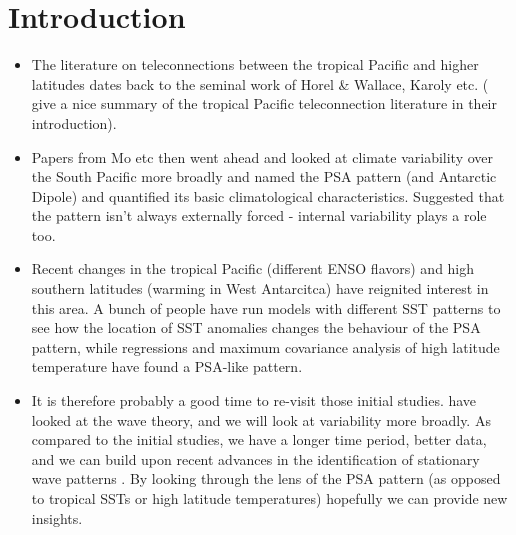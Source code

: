 \section{Introduction}

\begin{itemize}
\item The literature on teleconnections between the tropical Pacific and higher latitudes dates back to the seminal work of Horel & Wallace, Karoly etc. (\citet{Ciasto2015} give a nice summary of the tropical Pacific teleconnection literature in their introduction).
\item Papers from Mo etc then went ahead and looked at climate variability over the South Pacific more broadly and named the PSA pattern (and Antarctic Dipole) and quantified its basic climatological characteristics. Suggested that the pattern isn't always externally forced - internal variability plays a role too.
\item Recent changes in the tropical Pacific (different ENSO flavors) and high southern latitudes (warming in West Antarcitca) have reignited interest in this area. A bunch of people have run models with different SST patterns to see how the location of SST anomalies changes the behaviour of the PSA pattern, while regressions and maximum covariance analysis of high latitude temperature have found a PSA-like pattern. 
\item It is therefore probably a good time to re-visit those initial studies. \citet{Li2015} have looked at the wave theory, and we will look at variability more broadly. As compared to the initial studies, we have a longer time period, better data, and we can build upon recent advances in the identification of stationary wave patterns \citep[e.g.][]{Irving2015}. By looking through the lens of the PSA pattern (as opposed to tropical SSTs or high latitude temperatures) hopefully we can provide new insights.
\end{itemize}
  